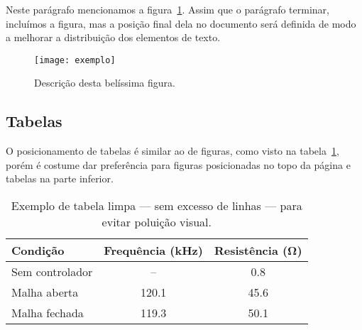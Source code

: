 Neste parágrafo mencionamos a figura~\ref{fig:exemplo}.
Assim que o parágrafo terminar, incluímos a figura, mas a posição final dela no documento será definida de modo a melhorar a distribuição dos elementos de texto.

\begin{figure}[htpb]
\centering
\texttt{[image: exemplo]}
\caption{Descrição desta belíssima figura.}
\label{fig:exemplo}
\end{figure}


\subsection{Tabelas}

O posicionamento de tabelas é similar ao de figuras, como visto na tabela~\ref{tab:exemplo}, porém é costume dar preferência para figuras posicionadas no topo da página e tabelas na parte inferior.

\begin{table}[hbpt]
\centering
\caption{Exemplo de tabela limpa --- sem excesso de linhas --- para evitar poluição visual.}
\label{tab:exemplo}
\begin{tabular}{lcc}
\toprule
Condição & Frequência (\si{kHz}) & Resistência (\si{\ohm}) \\
\midrule
Sem controlador & -- & \num{0.8} \\
Malha aberta & \num{120.1} & \num{45.6} \\
Malha fechada & \num{119.3} & \num{50.1} \\
\bottomrule
\end{tabular}
\end{table}

